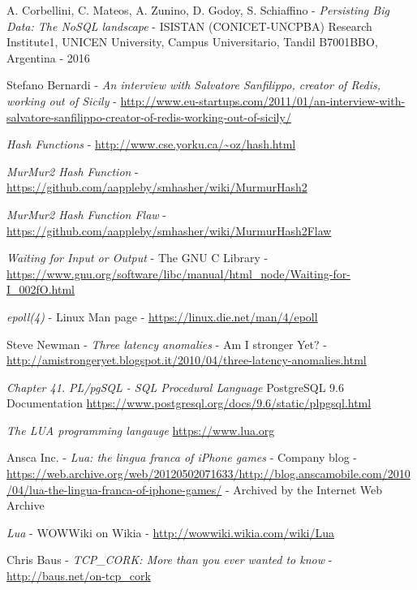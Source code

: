 \begin{thebibliography}{99}

	A. Corbellini, C. Mateos, A. Zunino, D. Godoy, S. Schiaffino - 
	\emph{Persisting Big Data: The NoSQL landscape} - 
	ISISTAN (CONICET-UNCPBA) Research Institute1, UNICEN University, Campus Universitario, Tandil B7001BBO, Argentina - 
	2016

	Stefano Bernardi - 
	\emph{An interview with Salvatore Sanfilippo, creator of Redis, working out of Sicily} - 
	\url{http://www.eu-startups.com/2011/01/an-interview-with-salvatore-sanfilippo-creator-of-redis-working-out-of-sicily/}

	\emph{Hash Functions} - 
	\url{http://www.cse.yorku.ca/~oz/hash.html}

	\emph{MurMur2 Hash Function} -
	\url{https://github.com/aappleby/smhasher/wiki/MurmurHash2}

	\emph{MurMur2 Hash Function Flaw} -
	\url{https://github.com/aappleby/smhasher/wiki/MurmurHash2Flaw}

	\emph{Waiting for Input or Output} - 
	The GNU C Library - 
	\url{https://www.gnu.org/software/libc/manual/html_node/Waiting-for-I_002fO.html}

	\emph{epoll(4)} - 
	Linux Man page - 
	\url{https://linux.die.net/man/4/epoll}

	Steve Newman -
	\emph{Three latency anomalies} - 
	Am I stronger Yet? - 
	\url{http://amistrongeryet.blogspot.it/2010/04/three-latency-anomalies.html}

	\emph{Chapter 41. PL/pgSQL - SQL Procedural Language}
	PostgreSQL 9.6 Documentation
	\url{https://www.postgresql.org/docs/9.6/static/plpgsql.html}

	\emph{The LUA programming langauge}
	\url{https://www.lua.org}

	Ansca Inc. -
	\emph{Lua: the lingua franca of iPhone games} -
	Company blog -
	\url{https://web.archive.org/web/20120502071633/http://blog.anscamobile.com/2010/04/lua-the-lingua-franca-of-iphone-games/} -
	Archived by the Internet Web Archive

	\emph{Lua} -
	WOWWiki on Wikia -
	\url{http://wowwiki.wikia.com/wiki/Lua}

	Chris Baus -
	\emph{TCP\_CORK: More than you ever wanted to know} -
	\url{http://baus.net/on-tcp_cork}


\end{thebibliography}
